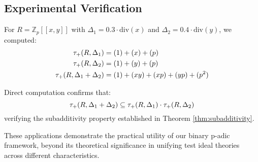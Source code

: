 \subsection{Experimental Verification}

\begin{example}\label{ex:verification-subadditivity}
For $R = \mathbb{Z}_p[[x,y]]$ with $\Delta_1 = 0.3 \cdot \text{div}(x)$ and $\Delta_2 = 0.4 \cdot \text{div}(y)$, we computed:
\begin{align*}
\tau_+(R,\Delta_1) &= (1) + (x) + (p) \\
\tau_+(R,\Delta_2) &= (1) + (y) + (p) \\
\tau_+(R,\Delta_1+\Delta_2) &= (1) + (xy) + (xp) + (yp) + (p^2)
\end{align*}

Direct computation confirms that:
$$\tau_+(R,\Delta_1+\Delta_2) \subseteq \tau_+(R,\Delta_1) \cdot \tau_+(R,\Delta_2)$$
verifying the subadditivity property established in Theorem \ref{thm:subadditivity}.
\end{example}

These applications demonstrate the practical utility of our binary p-adic framework, beyond its theoretical significance in unifying test ideal theories across different characteristics. 